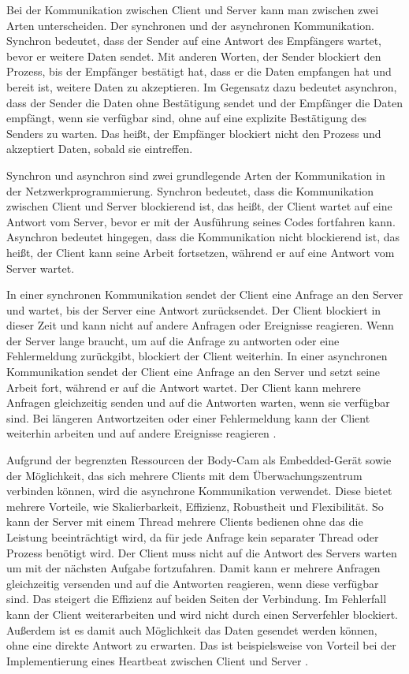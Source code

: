 \documentclass[thesis.tex]{subfiles}
\begin{document}
Bei der Kommunikation zwischen Client und Server kann man zwischen zwei Arten unterscheiden.
Der synchronen und der asynchronen Kommunikation.
Synchron bedeutet, dass der Sender auf eine Antwort des Empfängers wartet, bevor er weitere Daten sendet.
Mit anderen Worten, der Sender blockiert den Prozess, bis der Empfänger bestätigt hat, dass er die Daten empfangen hat und bereit ist, weitere Daten zu akzeptieren.
Im Gegensatz dazu bedeutet asynchron, dass der Sender die Daten ohne Bestätigung sendet und der Empfänger die Daten empfängt, wenn sie verfügbar sind, ohne auf eine explizite Bestätigung des Senders zu warten.
Das heißt, der Empfänger blockiert nicht den Prozess und akzeptiert Daten, sobald sie eintreffen.

Synchron und asynchron sind zwei grundlegende Arten der Kommunikation in der Netzwerkprogrammierung.
Synchron bedeutet, dass die Kommunikation zwischen Client und Server blockierend ist, das heißt, der Client wartet auf eine Antwort vom Server, bevor er mit der Ausführung seines Codes fortfahren kann.
Asynchron bedeutet hingegen, dass die Kommunikation nicht blockierend ist, das heißt, der Client kann seine Arbeit fortsetzen, während er auf eine Antwort vom Server wartet.

In einer synchronen Kommunikation sendet der Client eine Anfrage an den Server und wartet, bis der Server eine Antwort zurücksendet.
Der Client blockiert in dieser Zeit und kann nicht auf andere Anfragen oder Ereignisse reagieren.
Wenn der Server lange braucht, um auf die Anfrage zu antworten oder eine Fehlermeldung zurückgibt, blockiert der Client weiterhin.
In einer asynchronen Kommunikation sendet der Client eine Anfrage an den Server und setzt seine Arbeit fort, während er auf die Antwort wartet.
Der Client kann mehrere Anfragen gleichzeitig senden und auf die Antworten warten, wenn sie verfügbar sind.
Bei längeren Antwortzeiten oder einer Fehlermeldung kann der Client weiterhin arbeiten und auf andere Ereignisse reagieren
\cite[vgl. S.1-3]{lim2019directly}.

Aufgrund der begrenzten Ressourcen der Body-Cam als Embedded-Gerät sowie der Möglichkeit, das sich mehrere Clients mit dem Überwachungszentrum verbinden können, wird die asynchrone Kommunikation verwendet.
Diese bietet mehrere Vorteile, wie Skalierbarkeit, Effizienz, Robustheit und Flexibilität.
So kann der Server mit einem Thread mehrere Clients bedienen ohne das die Leistung beeinträchtigt wird, da für jede Anfrage kein separater Thread oder Prozess benötigt wird.
Der Client muss nicht auf die Antwort des Servers warten um mit der nächsten Aufgabe fortzufahren.
Damit kann er mehrere Anfragen gleichzeitig versenden und auf die Antworten reagieren, wenn diese verfügbar sind.
Das steigert die Effizienz auf beiden Seiten der Verbindung.
Im Fehlerfall kann der Client weiterarbeiten und wird nicht durch einen Serverfehler blockiert.
Außerdem ist es damit auch Möglichkeit das Daten gesendet werden können, ohne eine direkte Antwort zu erwarten.
Das ist beispielsweise von Vorteil bei der Implementierung eines Heartbeat zwischen Client und Server
\cite[vgl.]{whyAsync,thinkAsync}.
\end{document}
